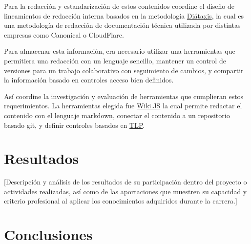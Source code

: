 \documentclass[12pt]{caltech_thesis}
\begin{document}
Para la redacción y estandarización de estos contenidos coordine el diseño de lineamientos de redacción interna basados en la metodología \href{https://diataxis.fr/}{Diátaxis}, la cual es una metodología de redacción de documentación técnica utilizada por distintas empresas como Canonical o CloudFlare.

Para almacenar esta información, era necesario utilizar una herramientas que permitiera una redacción con un lenguaje sencillo, mantener un control de versiones para un trabajo colaborativo con seguimiento de cambios, y compartir la información basado en controles acceso bien definidos.

Así coordine la investigación y evaluación de herramientas que cumplieran estos requerimientos. La herramientas elegida fue \href{https://js.wiki/}{Wiki.JS} la cual permite redactar el contenido con el lenguaje markdown, conectar el contenido a un repositorio basado git, y definir controles basados en \href{https://www.first.org/tlp/}{TLP}.



\chapter{Resultados}

[Descripción y análisis de los resultados de su participación dentro del proyecto o actividades realizadas, así como de las aportaciones que muestren su capacidad y criterio profesional al aplicar los conocimientos adquiridos durante la carrera.]


\chapter{Conclusiones}
\end{document}
